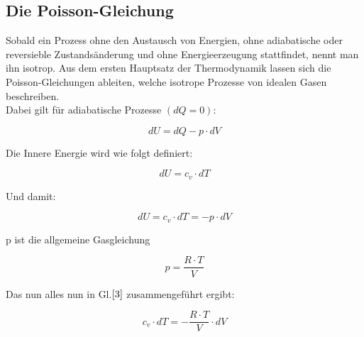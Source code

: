 \documentclass{article}
\begin{document}
{\begin{center}
\begin{minipage}{\linewidth}
\centering
{}
\label{sch}
\end{minipage}
\end{center}

\subsection{Die Poisson-Gleichung}
Sobald ein Prozess ohne den Austausch von Energien, ohne adiabatische oder reversieble Zustandsänderung und ohne Energieerzeugung stattfindet, nennt man ihn isotrop. Aus dem ersten Hauptsatz der Thermodynamik lassen sich die Poisson-Gleichungen ableiten, welche isotrope Prozesse von idealen Gasen beschreiben.\\

Dabei gilt für adiabatische Prozesse \((dQ=0)\):

\begin{equation}
\label{1}
dU=dQ-p \cdot dV
\end{equation}

Die Innere Energie wird wie folgt definiert:

\begin{equation}
\label{2}
dU=c_{v} \cdot dT
\end{equation}

Und damit:

\begin{equation}
\label{3}
dU=c_{v} \cdot dT=-p \cdot dV
\end{equation}

p ist die allgemeine Gasgleichung 

\begin{equation}
\label{4}
p= \frac{R \cdot T}{V}
\end{equation}

Das nun alles nun in Gl.\(\eqref{3}\) zusammengeführt ergibt:

\begin{equation}
\label{5}
c_{v} \cdot dT=- \frac{R \cdot T}{V} \cdot dV
\end{equation}

}
\end{document}
